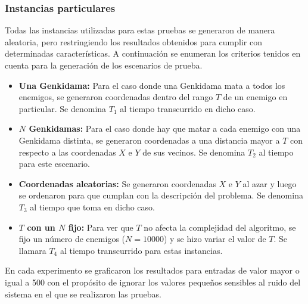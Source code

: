         \subsubsection{Instancias particulares}

            Todas las instancias utilizadas para estas pruebas se generaron de manera aleatoria, pero restringiendo los resultados obtenidos para cumplir con determinadas características. A continuación se enumeran los criterios tenidos en cuenta para la generación de los escenarios de prueba.

            \begin{itemize}
                \item \textbf{Una Genkidama:} Para el caso donde una
					Genkidama mata a todos los enemigos, se generaron
					coordenadas dentro del rango $T$ de un enemigo en
					particular. Se denomina $T_1$ al tiempo transcurrido en dicho caso.

                \item \textbf{$N$ Genkidamas:} Para el caso donde hay que matar
					a cada enemigo con una Genkidama distinta, se generaron coordenadas a
					una distancia mayor a $T$ con respecto a las coordenadas $X$ e
					$Y$ de sus vecinos. Se denomina $T_2$ al tiempo para este
					escenario.

				\item \textbf{Coordenadas aleatorias:} Se generaron coordenadas
				$X$ e $Y$ al azar y luego se ordenaron para que cumplan con la
			descripción del problema. Se denomina $T_3$ al tiempo que toma en dicho caso.

				\item \textbf{$T$ con un $N$ fijo:} Para ver que $T$ no	afecta
					la complejidad del algoritmo, se fijo un número de enemigos
					($N = 10000$) y se hizo variar el valor de $T$. Se llamara $T_4$
					al tiempo transcurrido para estas instancias.
            \end{itemize}

		En cada experimento se graficaron los resultados para entradas de valor
		mayor o igual a 500 con el propósito de ignorar los valores pequeños sensibles al ruido
		del sistema en el que se realizaron las pruebas.


    \renewcommand\constante{5}


